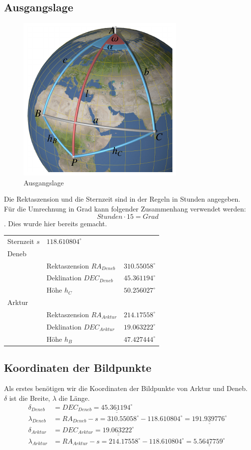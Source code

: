 \subsection{Ausgangslage}
\begin{figure}
	\includegraphics{papers/nav/bilder/position1.pdf}
	\caption{Ausgangslage}
\end{figure}
Die Rektaszension und die Sternzeit sind in der Regeln in Stunden angegeben.
Für die Umrechnung in Grad kann folgender Zusammenhang verwendet werden:
\[ Stunden \cdot 15 = Grad\].
Dies wurde hier bereits gemacht.
\begin{center}
	\begin{tabular}{l l l}
		Sternzeit $s$ & $118.610804^\circ$ \\
		Deneb&\\
		& Rektaszension $RA_{Deneb}$& $310.55058^\circ$ \\
		& Deklination $DEC_{Deneb}$& $45.361194^\circ$ \\
		& Höhe $h_C$ & $50.256027^\circ$ \\ 
		Arktur &\\
		& Rektaszension $RA_{Arktur}$& $214.17558^\circ$ \\
		& Deklination $DEC_{Arktur}$& $19.063222^\circ$ \\
		& Höhe $h_B$ & $47.427444^\circ$ \\  
	\end{tabular}
\end{center}
\subsection{Koordinaten der Bildpunkte}
Als erstes benötigen wir die Koordinaten der Bildpunkte von Arktur und Deneb. 
$\delta$ ist die Breite, $\lambda$ die Länge.
\begin{align}
\delta_{Deneb}&=DEC_{Deneb} = \underline{\underline{45.361194^\circ}} \nonumber \\ 
\lambda_{Deneb}&=RA_{Deneb} - s = 310.55058^\circ -118.610804^\circ =\underline{\underline{191.939776^\circ}}   \nonumber \\ 
\delta_{Arktur}&=DEC_{Arktur} =  \underline{\underline{19.063222^\circ}} \nonumber \\ 
\lambda_{Arktur}&=RA_{Arktur} - s = 214.17558^\circ -118.610804^\circ = \underline{\underline{5.5647759^\circ}}  \nonumber  
\end{align}



